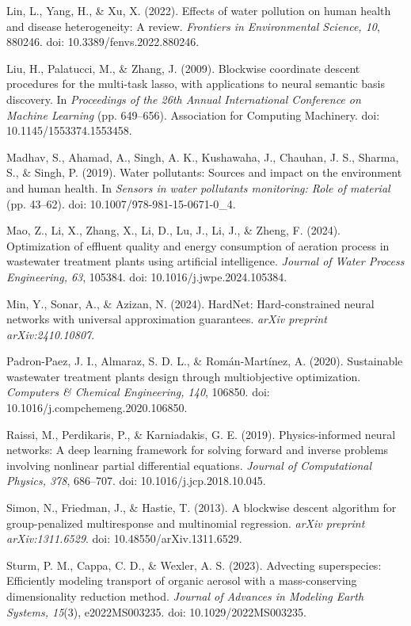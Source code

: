 \documentclass[a4paper,fleqn]{cas-sc}
\begin{document}
\noindent Lin, L., Yang, H., \& Xu, X. (2022). Effects of water pollution on human health and disease heterogeneity: A review. \textit{Frontiers in Environmental Science, 10}, 880246. doi: 10.3389/fenvs.2022.880246.

\noindent Liu, H., Palatucci, M., \& Zhang, J. (2009). Blockwise coordinate descent procedures for the multi-task lasso, with applications to neural semantic basis discovery. In \textit{Proceedings of the 26th Annual International Conference on Machine Learning} (pp. 649--656). Association for Computing Machinery. doi: 10.1145/1553374.1553458.

\noindent Madhav, S., Ahamad, A., Singh, A. K., Kushawaha, J., Chauhan, J. S., Sharma, S., \& Singh, P. (2019). Water pollutants: Sources and impact on the environment and human health. In \textit{Sensors in water pollutants monitoring: Role of material} (pp. 43--62). doi: 10.1007/978-981-15-0671-0\_4.

\noindent Mao, Z., Li, X., Zhang, X., Li, D., Lu, J., Li, J., \& Zheng, F. (2024). Optimization of effluent quality and energy consumption of aeration process in wastewater treatment plants using artificial intelligence. \textit{Journal of Water Process Engineering, 63}, 105384. doi: 10.1016/j.jwpe.2024.105384.

\noindent Min, Y., Sonar, A., \& Azizan, N. (2024). HardNet: Hard-constrained neural networks with universal approximation guarantees. \textit{arXiv preprint arXiv:2410.10807}.

\noindent Padron-Paez, J. I., Almaraz, S. D. L., \& Rom\'an-Mart\'inez, A. (2020). Sustainable wastewater treatment plants design through multiobjective optimization. \textit{Computers \& Chemical Engineering, 140}, 106850. doi: 10.1016/j.compchemeng.2020.106850.

\noindent Raissi, M., Perdikaris, P., \& Karniadakis, G. E. (2019). Physics-informed neural networks: A deep learning framework for solving forward and inverse problems involving nonlinear partial differential equations. \textit{Journal of Computational Physics, 378}, 686--707. doi: 10.1016/j.jcp.2018.10.045.

\noindent Simon, N., Friedman, J., \& Hastie, T. (2013). A blockwise descent algorithm for group-penalized multiresponse and multinomial regression. \textit{arXiv preprint arXiv:1311.6529}. doi: 10.48550/arXiv.1311.6529.

\noindent Sturm, P. M., Cappa, C. D., \& Wexler, A. S. (2023). Advecting superspecies: Efficiently modeling transport of organic aerosol with a mass-conserving dimensionality reduction method. \textit{Journal of Advances in Modeling Earth Systems, 15}(3), e2022MS003235. doi: 10.1029/2022MS003235.
\end{document}
